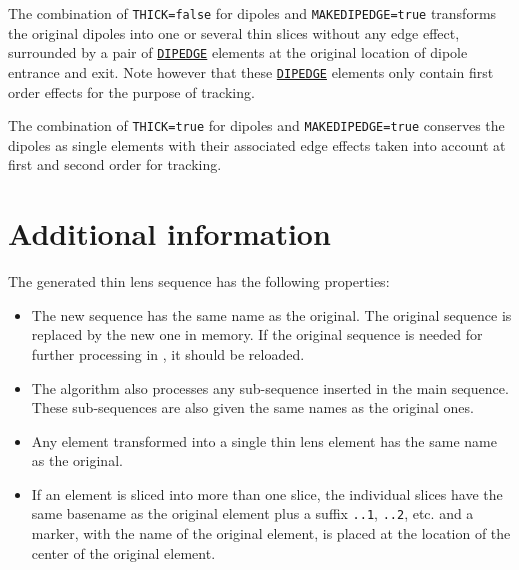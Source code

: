 The combination of {\tt THICK=false} for dipoles and {\tt MAKEDIPEDGE=true} 
transforms the original dipoles into one or several thin slices without 
any edge effect, surrounded by a pair of \hyperref[sec:dipedge]{\tt DIPEDGE} 
elements at the original location of dipole entrance and exit. 
Note however that these \hyperref[sec:dipedge]{\tt DIPEDGE} elements only 
contain first order effects for the purpose of tracking. 

The combination of {\tt THICK=true} for dipoles and {\tt MAKEDIPEDGE=true} 
conserves the dipoles as single elements with their associated edge effects 
taken into account at first and second order for tracking. 


\section{Additional information}

The generated thin lens sequence has the following properties: 
\begin{itemize}
\item The new sequence has the same name as the original. 
  The original sequence is replaced by the new one in memory. 
  If the original sequence is needed for further processing in \madx, 
  it should be reloaded.
\item The algorithm also processes any sub-sequence inserted in the main
  sequence. These sub-sequences are also given the same names as the
  original ones. 
\item Any element transformed into a single thin lens element has the
  same name as the original. 
\item If an element is sliced into more than one slice, the individual
  slices have the same basename as the original element plus a suffix 
  {\tt ..1}, {\tt ..2}, etc. and a marker, with the name of the original
  element, is placed at the location of the center of the original element.
\end{itemize}


